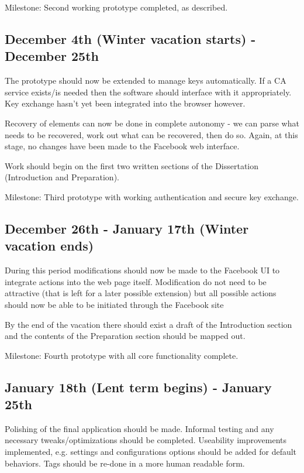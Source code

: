 Milestone: Second working prototype completed, as described.


\subsection*{December 4th (Winter vacation starts) - December 25th}

The prototype should now be extended to manage keys automatically. If a CA service exists/is needed then the software should interface with it appropriately. Key exchange hasn't yet been integrated into the browser however.

Recovery of elements can now be done in complete autonomy - we can parse what needs to be recovered, work out what can be recovered, then do so. Again, at this stage, no changes have been made to the Facebook web interface.

Work should begin on the first two written sections of the Dissertation (Introduction and Preparation).

Milestone: Third prototype with working authentication and secure key exchange.

\subsection*{December 26th  - January 17th (Winter vacation ends)}

During this period modifications should now be made to the Facebook UI to integrate actions into the web page itself. Modification do not need to be attractive (that is left for a later possible extension) but all possible actions should now be able to be initiated through the Facebook site

By the end of the vacation there should exist a draft of the Introduction section and the contents of the Preparation section should be mapped out.

Milestone: Fourth prototype with all core functionality complete.

\subsection*{January 18th (Lent term begins) - January 25th}

Polishing of the final application should be made. Informal testing and any necessary tweaks/optimizations should be completed. Useability improvements implemented, e.g. settings and configurations options should be added for default behaviors. Tags should be re-done in a more human readable form.

